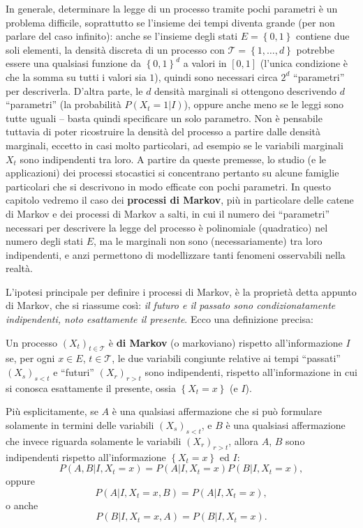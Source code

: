 \documentclass[
  italian,
  letterpaper,
]{book}
\newcommand{\cur}[1]{\left\{ #1 \right\}}
\theoremstyle{definition}
\theoremstyle{remark}
\begin{document}
In generale, determinare la legge di un processo tramite pochi parametri
è un problema difficile, soprattutto se l'insieme dei tempi diventa
grande (per non parlare del caso infinito): anche se l'insieme degli
stati \(E = \cur{0,1}\) contiene due soli elementi, la densità discreta
di un processo con \(\mathcal{T} = \cur{1, \ldots, d}\) potrebbe essere
una qualsiasi funzione da \(\cur{0,1}^d\) a valori in \([0,1]\) (l'unica
condizione è che la somma su tutti i valori sia \(1\)), quindi sono
necessari circa \(2^d\) ``parametri'' per descriverla. D'altra parte, le
\(d\) densità marginali si ottengono descrivendo \(d\) ``parametri'' (la
probabilità \(P(X_t = 1 |I)\)), oppure anche meno se le leggi sono tutte
uguali -- basta quindi specificare un solo parametro. Non è pensabile
tuttavia di poter ricostruire la densità del processo a partire dalle
densità marginali, eccetto in casi molto particolari, ad esempio se le
variabili marginali \(X_t\) sono indipendenti tra loro. A partire da
queste premesse, lo studio (e le applicazioni) dei processi stocastici
si concentrano pertanto su alcune famiglie particolari che si descrivono
in modo efficate con pochi parametri. In questo capitolo vedremo il caso
dei \textbf{processi di Markov}, più in particolare delle catene di
Markov e dei processi di Markov a salti, in cui il numero dei
``parametri'' necessari per descrivere la legge del processo è
polinomiale (quadratico) nel numero degli stati \(E\), ma le marginali
non sono (necessariamente) tra loro indipendenti, e anzi permettono di
modellizzare tanti fenomeni osservabili nella realtà.

L'ipotesi principale per definire i processi di Markov, è la proprietà
detta appunto di Markov, che si riassume così: \emph{il futuro e il
passato sono condizionatamente indipendenti, noto esattamente il
presente}. Ecco una definizione precisa:

Un processo \((X_t)_{t \in \mathcal{T}}\) è \textbf{di Markov} (o
markoviano) rispetto all'informazione \(I\) se, per ogni \(x \in E\),
\(t \in \mathcal{T}\), le due variabili congiunte relative ai tempi
``passati'' \((X_s)_{s <t}\) e ``futuri'' \((X_r)_{r> t}\) sono
indipendenti, rispetto all'informazione in cui si conosca esattamente il
presente, ossia \(\cur{X_{t} = x}\) (e \(I\)).

Più esplicitamente, se \(A\) è una qualsiasi affermazione che si può
formulare solamente in termini delle variabili \((X_s)_{s <t}\), e \(B\)
è una qualsiasi affermazione che invece riguarda solamente le variabili
\((X_r)_{r> t}\), allora \(A\), \(B\) sono indipendenti rispetto
all'informazione \(\cur{X_t = x}\) ed \(I\):
\[ P(A, B | I, X_t = x) = P(A | I, X_t = x) P( B | I, X_t = x),\] oppure
\[ P(A | I, X_t = x, B) = P(A | I, X_t = x),\] o anche
\[P( B | I, X_t = x, A) = P(B | I, X_t = x).\]
\end{document}
